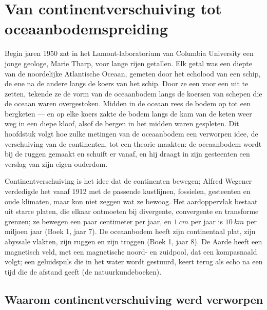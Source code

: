 \chapter{Van continentverschuiving tot oceaanbodemspreiding}\label{ch:g11:drift-to-spreading}

Begin jaren 1950 zat in het Lamont-laboratorium van Columbia University een jonge
geologe, Marie Tharp, voor lange rijen getallen. Elk getal was een diepte van de
noordelijke Atlantische Oceaan, gemeten door het echolood van een schip, de ene
na de andere langs de koers van het schip. Door ze een voor een uit te zetten,
tekende ze de vorm van de oceaanbodem langs de koersen van schepen die de oceaan
waren overgestoken. Midden in de oceaan rees de bodem op tot een bergketen --- en
op elke koers zakte de bodem langs de kam van de keten weer weg in een diepe
kloof, alsof de bergen in het midden waren gespleten. Dit hoofdstuk volgt hoe
zulke metingen van de oceaanbodem een verworpen idee, de verschuiving van de
continenten, tot een theorie maakten: de oceaanbodem wordt bij de ruggen gemaakt
en schuift er vanaf, en hij draagt in zijn gesteenten een verslag van zijn eigen
ouderdom.

\begin{recall}
Continentverschuiving is het idee dat de continenten bewegen; Alfred Wegener
verdedigde het vanaf 1912 met de passende kustlijnen, fossielen, gesteenten en
oude klimaten, maar kon niet zeggen wat ze bewoog. Het aardoppervlak bestaat uit
starre platen, die elkaar ontmoeten bij divergente, convergente en transforme
grenzen; ze bewegen een paar centimeter per jaar, en $\qty{1}{cm}$ per jaar is
$\qty{10}{km}$ per miljoen jaar (Boek 1, jaar 7). De oceaanbodem heeft zijn
continentaal plat, zijn abyssale vlakten, zijn ruggen en zijn troggen (Boek 1,
jaar 8). De Aarde heeft een magnetisch veld, met een magnetische noord- en
zuidpool, dat een kompasnaald volgt; een geluidspuls die in het water wordt
gestuurd, keert terug als echo na een tijd die de afstand geeft (de
natuurkundeboeken).
\end{recall}

\section{Waarom continentverschuiving werd verworpen}

